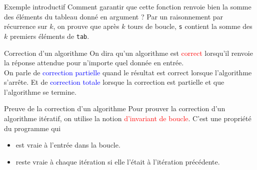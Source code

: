 \documentclass[10pt]{beamer}
\begin{document}
\begin{frame}[fragile]{\Ctitle}{\stitle}
    \begin{exampleblock}{Exemple introductif}
        Comment garantir que cette fonction renvoie bien la somme des éléments du tableau donné en argument ?
        \textcolor{OliveGreen}{Par un raisonnement par récurrence sur $k$, on  prouve que \og{} après $k$ tours de boucle, {\tt s} contient la somme des $k$ premiers éléments de {\tt tab}\fg{}.}
    \end{exampleblock}
\end{frame}

\begin{frame}[fragile]{\Ctitle}{\stitle}
\begin{alertblock}{Correction d'un algorithme}
    On dira qu'un algorithme est \textcolor{red}{correct}
     lorsqu'il renvoie la réponse attendue pour n'importe quel donnée en entrée.\\
     On parle de \textcolor{blue}{correction partielle} quand le résultat est correct lorsque l'algorithme s'arrête. Et de \textcolor{blue}{correction totale} lorsque la correction est partielle et que l'algorithme se termine.
\end{alertblock}
\end{frame}

\begin{frame}[fragile]{\Ctitle}{\stitle}
\begin{alertblock}{Preuve de la correction d'un algorithme}
    Pour prouver la correction d'un algorithme itératif, on utilise la notion \textcolor{red}{d'invariant de boucle}. C'est une propriété du programme qui
    \begin{itemize}
        \item<2-> est vraie à l'entrée dans la boucle.
        \item<3-> reste vraie à chaque itération si elle l'était à l'itération précédente.
    \end{itemize}
\end{alertblock}
\end{frame}
\end{document}
